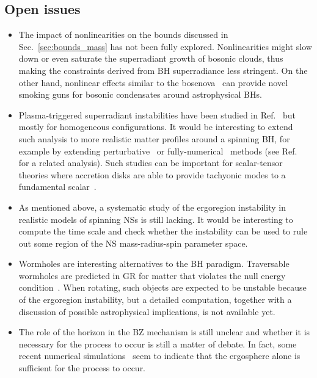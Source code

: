 \documentclass[11pt]{article}
\numberwithin{equation}{section} %
\begin{document}
\subsection{Open issues}

\begin{itemize}


\item The impact of nonlinearities on the bounds discussed in Sec.~\ref{sec:bounds_mass} has not been fully explored. Nonlinearities might slow down or even saturate the superradiant growth of bosonic clouds, thus making the constraints derived from BH superradiance less stringent. On the other hand, nonlinear effects similar to the bosenova~\cite{Yoshino:2012kn,Kodama:2011zc} can provide novel smoking guns for bosonic condensates around astrophysical BHs.


\item Plasma-triggered superradiant instabilities have been studied in Ref.~\cite{Pani:2013hpa} but mostly for homogeneous configurations. It would be interesting to extend such analysis to more realistic matter profiles around a spinning BH, for example by extending perturbative~\cite{Pani:2013pma} or fully-numerical~\cite{Witek:2012tr} methods (see Ref.~\cite{VanPutten:1999vda} for a related analysis). Such studies can be important for scalar-tensor theories where accretion disks are able to provide tachyonic modes to a fundamental scalar~\cite{Cardoso:2013fwa,Dima:2020rzg}.

\item As mentioned above, a systematic study of the ergoregion instability in realistic models of spinning NSs is still lacking. It would be interesting to compute the time scale and check whether the instability can be used to rule out some region of the NS mass-radius-spin parameter space.

\item Wormholes are interesting alternatives to the BH paradigm. Traversable wormholes are predicted in GR for matter 
that violates the null energy condition~\cite{Visserbook}. When rotating, such objects are expected to be unstable 
because of the ergoregion instability, but a detailed computation, together with a discussion of possible astrophysical 
implications, is not available yet.


\item The role of the horizon in the BZ 
mechanism is still unclear and whether it is necessary for the process to occur is still a matter of debate. In fact, 
some recent numerical simulations~\cite{Ruiz:2012te} seem to indicate that the ergosphere alone is sufficient for the 
process to occur.


\end{itemize}
\end{document}
